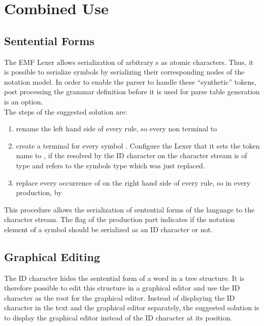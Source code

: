 \chapter{Combined Use}



\section{Sentential Forms}
The EMF Lexer  allows serialization of arbitrary s as atomic characters. Thus, it is possible to serialize symbols by serializing their corresponding nodes of the notation model. In order to enable the parser to handle these ``synthetic'' tokens, post processing the grammar definition before it is used for parse table generation is an option. \\
The steps of the suggested solution are:
\begin{enumerate}
	\item rename the left hand side of every rule, so every non terminal  to 
	\item create a terminal  for every symbol . Configure the Lexer that it sets the token name to , if the  resolved by the ID character on the character stream is of type  and refers to the symbols type which was just replaced. 
	\item replace every occurrence of  on the right hand side of every rule, so in every production, by 
\end{enumerate}

This procedure allows the serialization of sentential forms of the language to the character stream. The  flag of the production part indicates if the notation element of a symbol should be serialized as an ID character or not. 

\section{Graphical Editing}
The ID character hides the sentential form of a word in a tree structure. It is therefore possible to edit this structure in a graphical editor and use the ID character as the root for the graphical editor. Instead of displaying the ID character in the text and the graphical editor separately, the suggested solution is to display the graphical editor instead of the ID character at its position.


